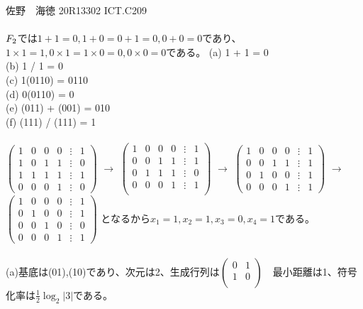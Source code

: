 \documentclass[11pt]{article}
\begin{document}
    佐野　海徳 20R13302 ICT.C209\\
\\
$\boldmath{F}_2$では$1 + 1 = 0,1 + 0 = 0 + 1 = 0, 0 + 0 = 0$であり、$1 \times 1 = 1 , 0 \times 1 = 1 \times 0 = 0, 0 \times 0 = 0$である。
(a) 1 + 1 = 0\\
(b) 1 / 1 = 0\\
(c) 1(0110) = 0110\\
(d) 0(0110) = 0\\
(e) (011) + (001) = 010\\
(f) (111) / (111) = 1\\
\\
    $\left(
    \begin{array}{cccccc}
    1 & 0 & 0 & 0 & \vdots & 1 \\
    1 & 0 & 1 & 1 & \vdots & 0 \\
    1 & 1 & 1 & 1 & \vdots & 1 \\
    0 & 0 & 0 & 1 & \vdots & 0
    \end{array}
    \right)$
$\to$
$\left(
\begin{array}{cccccc}
1 & 0 & 0 & 0 & \vdots & 1 \\
0 & 0 & 1 & 1 & \vdots & 1 \\
0 & 1 & 1 & 1 & \vdots & 0 \\
0 & 0 & 0 & 1 & \vdots & 1 \\
\end{array}
\right)$
$\to$
$\left(
\begin{array}{cccccc}
1 & 0 & 0 & 0 & \vdots & 1 \\
0 & 0 & 1 & 1 & \vdots & 1 \\
0 & 1 & 0 & 0 & \vdots & 1 \\
0 & 0 & 0 & 1 & \vdots & 1
\end{array}
\right)$
$\to$
$\left(
\begin{array}{cccccc}
1 & 0 & 0 & 0 & \vdots & 1 \\
0 & 1 & 0 & 0 & \vdots & 1 \\
0 & 0 & 1 & 0 & \vdots & 0 \\
0 & 0 & 0 & 1 & \vdots & 1
\end{array}
\right)$
となるから$x_1 = 1,x_2 = 1,x_3 = 0,x_4 = 1$である。\\
\\
(a)基底は(01),(10)であり、次元は2、生成行列は$\left(\begin{array}{cc}
0 & 1 \\
1 & 0 \\
\end{array}\right)$　最小距離は1、符号化率は$\frac{1}{2} \log_2 |3|$である。\\
\end{document}
